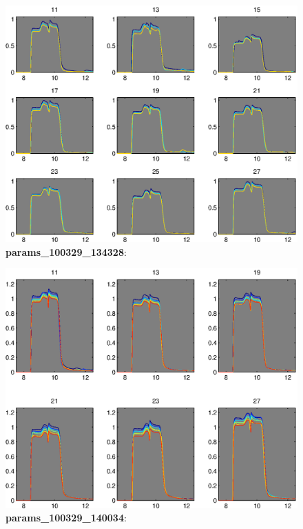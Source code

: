 \documentclass[a4paper]{report}
\begin{document}
\begin{figure}
\centering
\includegraphics[width=5in]{params_100329_134328.eps}
\caption{\textbf{params\_100329\_134328}:}
\end{figure}


\begin{figure}
\centering
\includegraphics[width=5in]{params_100329_140034.eps}
\caption{\textbf{params\_100329\_140034}:}
\end{figure}
\end{document}
